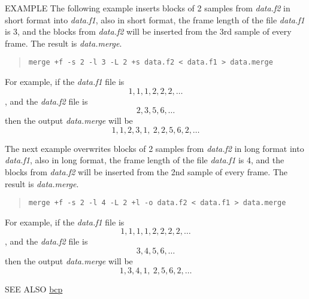 \begin{qsection}{EXAMPLE}
The following example inserts blocks of 2 samples from {\em data.f2}
in short format into {\em data.f1}, also in short format,
the frame length of the file {\em data.f1} is 3, and the blocks
from {\em data.f2} will be inserted from the 3rd sample of
every frame.
The result is {\em data.merge}.
\begin{quote}
 \verb!merge +f -s 2 -l 3 -L 2 +s data.f2 < data.f1 > data.merge!
\end{quote}
For example, if the {\em data.f1} file is 
\[ 1,1,1,2,2,2,\dots \], 
and the {\em data.f2} file is 
\[ 2,3,5,6,\dots \]
then the output {\em data.merge} will be 
\[ 1,1,2,3,1,~ 2,2,5,6,2,\dots \] 

The next example overwrites blocks of 2 samples from {\em data.f2}
in long format into {\em data.f1}, also in long format,
the frame length of the file {\em data.f1} is 4, and the blocks
from {\em data.f2} will be inserted from the 2nd sample of
every frame.
The result is {\em data.merge}.
\begin{quote}
 \verb!merge +f -s 2 -l 4 -L 2 +l -o data.f2 < data.f1 > data.merge!
\end{quote}
For example, if the {\em data.f1} file is 
\[ 1,1,1,1,2,2,2,2,\dots \], 
and the {\em data.f2} file is 
\[ 3,4,5,6,\dots \]
then the output {\em data.merge} will be 
\[  1,3,4,1,~ 2,5,6,2,\dots \] 

\end{qsection}

\begin{qsection}{SEE ALSO}
\hyperlink{bcp}{bcp}
\end{qsection}
